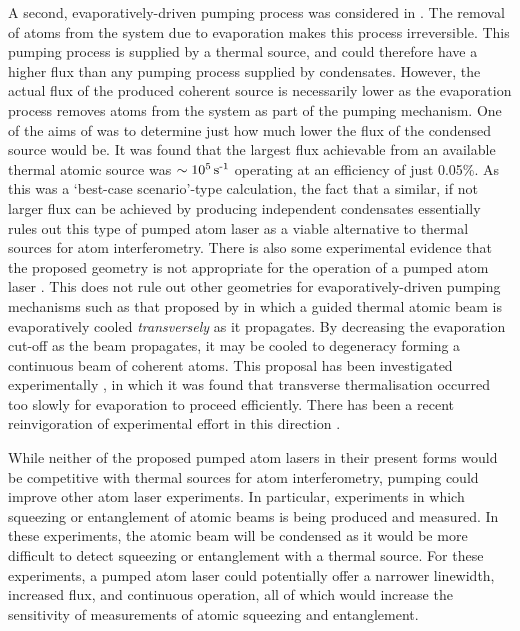 A second, evaporatively-driven pumping process was considered in .  The removal of atoms from the system due to evaporation makes this process irreversible.  This pumping process is supplied by a thermal source, and could therefore have a higher flux than any pumping process supplied by condensates.  However, the actual flux of the produced coherent source is necessarily lower as the evaporation process removes atoms from the system as part of the pumping mechanism.  One of the aims of  was to determine just how much lower the flux of the condensed source would be.  It was found that the largest flux achievable from an available thermal atomic source was $\sim\unit[10^5]{s\textsuperscript{-1}}$ operating at an efficiency of just 0.05\%.  As this was a `best-case scenario'-type calculation, the fact that a similar, if not larger flux can be achieved by producing independent condensates essentially rules out this type of pumped atom laser as a viable alternative to thermal sources for atom interferometry.  There is also some experimental evidence that the proposed geometry is not appropriate for the operation of a pumped atom laser \citep{Robins:2008}.  This does not rule out other geometries for evaporatively-driven pumping mechanisms such as that proposed by \citet{Mandonnet:2000lr} in which a guided thermal atomic beam is evaporatively cooled \emph{transversely} as it propagates.  By decreasing the evaporation cut-off as the beam propagates, it may be cooled to degeneracy forming a continuous beam of coherent atoms.  This proposal has been investigated experimentally \citep{Cren:2002rt,Roos:2003vn,Roos:2003,Lahaye:2004,Vogels:2004,Lahaye:2005uq}, in which it was found that transverse thermalisation occurred too slowly for evaporation to proceed efficiently.  There has been a recent reinvigoration of experimental effort in this direction \citep{Hempel:2008,Traxler:2009,Traxler:2010}.

While neither of the proposed pumped atom lasers in their present forms would be competitive with thermal sources for atom interferometry, pumping could improve other atom laser experiments.  In particular, experiments in which squeezing or entanglement of atomic beams is being produced and measured.  In these experiments, the atomic beam will be condensed as it would be more difficult to detect squeezing or entanglement with a thermal source.  For these experiments, a pumped atom laser could potentially offer a narrower linewidth, increased flux, and continuous operation, all of which would increase the sensitivity of measurements of atomic squeezing and entanglement.

